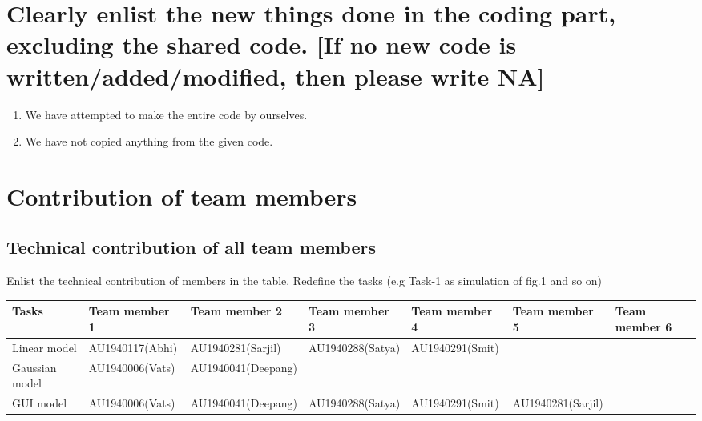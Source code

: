 \documentclass{article}
\begin{document}
\section{Clearly enlist the new things done in the coding part, excluding the shared code. [If no new code is written/added/modified, then please write NA]}

\begin{enumerate}
    \item We have attempted to make the entire code by ourselves.
    \item We have not copied anything from the given code.
\end{enumerate}



\section{Contribution of team members}	
\subsection{Technical contribution of all team members }
Enlist the technical contribution of members in the table. Redefine the tasks (e.g Task-1 as simulation of fig.1 and so on)
\begin{table}[h]
\centering
\begin{tabular}{|l|l|l|l|l|l|l|}
\hline
Tasks  & Team member 1 & Team member 2 & Team member 3 & Team member 4 & Team member 5 & Team member 6 \\ \hline
Linear model & AU1940117(Abhi)              &  AU1940281(Sarjil)             & AU1940288(Satya)              & AU1940291(Smit)              &               &                \\ \hline
Gaussian model & AU1940006(Vats)              & AU1940041(Deepang)              &               &               &               &            \\ \hline
GUI model & AU1940006(Vats)              & AU1940041(Deepang)              & AU1940288(Satya)              & AU1940291(Smit)              & AU1940281(Sarjil)              &             \\ \hline
\end{tabular}
\end{table}
\end{document}
